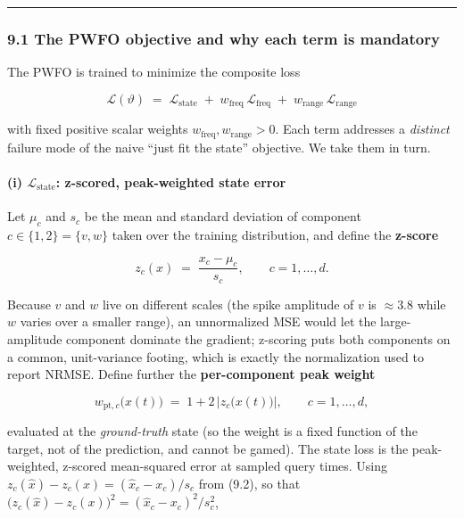 \documentclass[
  11pt,
]{article}
\providecommand{\gt}{>}
\begin{document}
\begin{center}\rule{0.5\linewidth}{0.5pt}\end{center}

\subsubsection{9.1 The PWFO objective and why each term is
mandatory}\label{the-pwfo-objective-and-why-each-term-is-mandatory}

The PWFO is trained to minimize the composite loss

\[
\boxed{\;\mathcal{L}(\vartheta)\;=\;\mathcal{L}_{\text{state}}\;+\;w_{\text{freq}}\,\mathcal{L}_{\text{freq}}\;+\;w_{\text{range}}\,\mathcal{L}_{\text{range}}\;}
\tag{9.1}
\]

with fixed positive scalar weights
\(w_{\text{freq}},w_{\text{range}}\gt 0\). Each term addresses a
\emph{distinct} failure mode of the naive ``just fit the state''
objective. We take them in turn.

\paragraph{\texorpdfstring{(i) \(\mathcal{L}_{\text{state}}\): z-scored,
peak-weighted state
error}{(i) \textbackslash mathcal\{L\}\_\{\textbackslash text\{state\}\}: z-scored, peak-weighted state error}}\label{i-mathcall_textstate-z-scored-peak-weighted-state-error}

Let \(\mu_c\) and \(s_c\) be the mean and standard deviation of
component \(c\in\{1,2\}=\{v,w\}\) taken over the training distribution,
and define the \textbf{z-score}

\[
z_c(x)\;=\;\frac{x_c-\mu_c}{s_c},\qquad c=1,\dots,d .
\tag{9.2}
\]

Because \(v\) and \(w\) live on different scales (the spike amplitude of
\(v\) is \(\approx 3.8\) while \(w\) varies over a smaller range), an
unnormalized MSE would let the large-amplitude component dominate the
gradient; z-scoring puts both components on a common, unit-variance
footing, which is exactly the normalization used to report NRMSE. Define
further the \textbf{per-component peak weight}

\[
w_{\text{pt},c}\!\big(x(t)\big)\;=\;1+2\,\big|z_c\!\big(x(t)\big)\big|,
\qquad c=1,\dots,d,
\tag{9.3}
\]

evaluated at the \emph{ground-truth} state (so the weight is a fixed
function of the target, not of the prediction, and cannot be gamed). The
state loss is the peak-weighted, z-scored mean-squared error at sampled
query times. Using \(z_c(\hat x)-z_c(x)=(\hat x_c-x_c)/s_c\) from (9.2),
so that \(\big(z_c(\hat x)-z_c(x)\big)^2=(\hat x_c-x_c)^2/s_c^2\),
\end{document}
